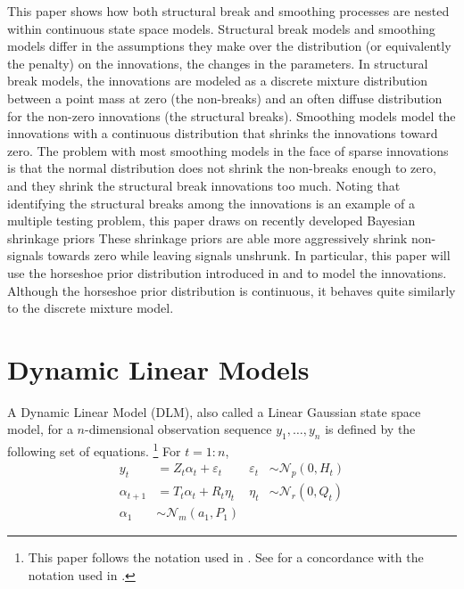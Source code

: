 \documentclass{article}
\newcommand{\paren}[1]{\ensuremath{\left(#1\right)}}
\newcommand{\dmvnorm}[2]{\ensuremath{\mathcal{N}_{#2}\paren{#1}}}
\begin{document}
This paper shows how both structural break and smoothing processes are nested within continuous state space models.
Structural break models and smoothing models differ in the assumptions they make over the distribution (or equivalently the penalty) on the innovations, the changes in the parameters.
In structural break models, the innovations are modeled as a discrete mixture distribution between a point mass at zero (the non-breaks) and an often diffuse distribution for the non-zero innovations (the structural breaks).
Smoothing models model the innovations with a continuous distribution that shrinks the innovations toward zero.
The problem with most smoothing models in the face of sparse innovations is that the normal distribution does not shrink the non-breaks enough to zero, and they shrink the structural break innovations too much.
Noting that identifying the structural breaks among the innovations is an example of a multiple testing problem, this paper draws on recently developed Bayesian shrinkage priors
These shrinkage priors are able more aggressively shrink non-signals towards zero while leaving signals unshrunk.
In particular, this paper will use the horseshoe prior distribution introduced in \textcite{CarvalhoPolsonScott2010} and \textcite{CarvalhoPolsonScott2009} to model the innovations.
Although the horseshoe prior distribution is continuous, it behaves quite similarly to the discrete mixture model.

\section{Dynamic Linear Models}
\label{sec:dynam-line-models}

A Dynamic Linear Model (DLM), also called a Linear Gaussian state space model, for a $n$-dimensional observation sequence $y_{1}, \dots, y_{n}$ is defined by the following set of equations.%
\footnote{This paper follows the notation used in \textcite{DurbinKoopman2001}. See \textcite{PetrisPetroneEtAl2009} for a concordance with the notation used in \textcite{WestHarrison1997}.}
For $t = 1:n$,
\begin{align}
  \label{eq:8}
  y_t &= Z_{t} \alpha_t + \varepsilon_t & \varepsilon_{t} &\sim \dmvnorm{0, H_{t}}{p} \\
  \label{eq:14}
  \alpha_{t+1} &= T_{t} \alpha_{t} + R_{t} \eta_{t} & \eta_{t} &\sim \dmvnorm{0, Q_{t}}{r} \\
  \label{eq:2}
  \alpha_{1} & \sim \dmvnorm{a_{1}, P_{1}}{m}
\end{align}
\end{document}
